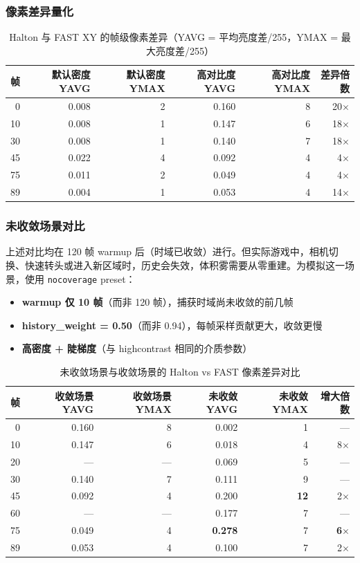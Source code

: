 \documentclass[11pt,a4paper]{article}
\begin{document}
\subsubsection{像素差异量化}

\begin{table}[H]
\centering
\small
\begin{tabular}{rrrrrr}
\toprule
帧 & 默认密度 YAVG & 默认密度 YMAX & 高对比度 YAVG & 高对比度 YMAX & 差异倍数 \\
\midrule
0 & 0.008 & 2 & 0.160 & 8 & 20$\times$ \\
10 & 0.008 & 1 & 0.147 & 6 & 18$\times$ \\
30 & 0.008 & 1 & 0.140 & 7 & 18$\times$ \\
45 & 0.022 & 4 & 0.092 & 4 & 4$\times$ \\
75 & 0.011 & 2 & 0.049 & 4 & 4$\times$ \\
89 & 0.004 & 1 & 0.053 & 4 & 14$\times$ \\
\bottomrule
\end{tabular}
\caption{Halton 与 FAST XY 的帧级像素差异（YAVG = 平均亮度差/255，YMAX = 最大亮度差/255）}
\end{table}

\subsubsection{未收敛场景对比}

上述对比均在 120 帧 warmup 后（时域已收敛）进行。但实际游戏中，相机切换、快速转头或进入新区域时，历史会失效，体积雾需要从零重建。为模拟这一场景，使用 \texttt{nocoverage} preset：

\begin{itemize}
    \item \textbf{warmup 仅 10 帧}（而非 120 帧），捕获时域尚未收敛的前几帧
    \item \textbf{history\_weight = 0.50}（而非 0.94），每帧采样贡献更大，收敛更慢
    \item \textbf{高密度 + 陡梯度}（与 highcontrast 相同的介质参数）
\end{itemize}

\begin{table}[H]
\centering
\small
\begin{tabular}{rrrrrr}
\toprule
帧 & 收敛场景 YAVG & 收敛场景 YMAX & 未收敛 YAVG & 未收敛 YMAX & 增大倍数 \\
\midrule
0 & 0.160 & 8 & 0.002 & 1 & --- \\
10 & 0.147 & 6 & 0.018 & 4 & 8$\times$ \\
20 & --- & --- & 0.069 & 5 & --- \\
30 & 0.140 & 7 & 0.111 & 9 & --- \\
45 & 0.092 & 4 & 0.200 & \textbf{12} & 2$\times$ \\
60 & --- & --- & 0.177 & 7 & --- \\
75 & 0.049 & 4 & \textbf{0.278} & 7 & \textbf{6$\times$} \\
89 & 0.053 & 4 & 0.100 & 7 & 2$\times$ \\
\bottomrule
\end{tabular}
\caption{未收敛场景与收敛场景的 Halton vs FAST 像素差异对比}
\end{table}
\end{document}
